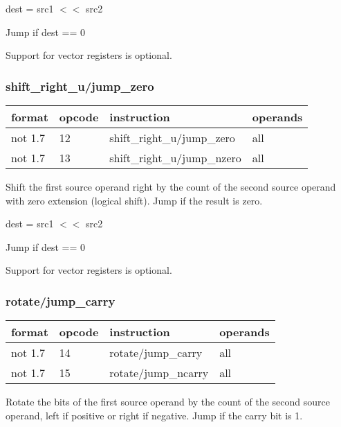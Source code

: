\documentclass[forwardcom.tex]{subfiles}
\begin{document}
dest = src1 $<<$ src2

Jump if dest == 0
\vspace{2mm}

Support for vector registers is optional.


\subsubsection{shift\_right\_u/jump\_zero}
\label{table:shiftRightUJumpZeroInstruction}
\begin{tabular}{|p{16mm}|p{12mm}|p{60mm}|p{50mm}|}
\hline
\bfseries format & \bfseries opcode & \bfseries instruction & \bfseries operands \\ \hline
not 1.7 & 12 & shift\_right\_u/jump\_zero & all \\ \hline
not 1.7 & 13 & shift\_right\_u/jump\_nzero & all \\ \hline
\end{tabular}
\vspace{2mm}

Shift the first source operand right by the count of the second source operand with zero extension (logical shift). Jump if the result is zero.
\vspace{2mm}

dest = src1 $<<$ src2

Jump if dest == 0
\vspace{2mm}

Support for vector registers is optional.


\subsubsection{rotate/jump\_carry}
\label{table:rotateJumpCarryInstruction}
\begin{tabular}{|p{16mm}|p{12mm}|p{60mm}|p{50mm}|}
\hline
\bfseries format & \bfseries opcode & \bfseries instruction & \bfseries operands \\ \hline
not 1.7 & 14 & rotate/jump\_carry & all \\ \hline
not 1.7 & 15 & rotate/jump\_ncarry & all \\ \hline
\end{tabular}
\vspace{2mm}

Rotate the bits of the first source operand by the count of the second source operand, left if positive or right if negative. Jump if the carry bit is 1.
\vspace{2mm}
\end{document}
